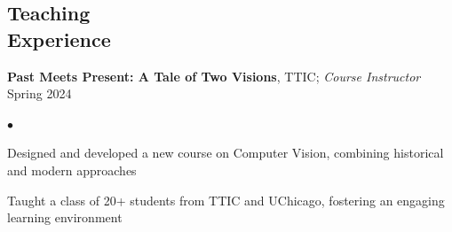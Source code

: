 \documentclass[margin,line]{res}
\newenvironment{list2}{
  \begin{list}{$\bullet$}{%
      \setlength{\itemsep}{0in}
      \setlength{\parsep}{0in} \setlength{\parskip}{0in}
      \setlength{\topsep}{0in} \setlength{\partopsep}{0in} 
      \setlength{\leftmargin}{0.2in}}}{\end{list}}
\begin{document}
\begin{resume}
\section{\sc \large Teaching \\ Experience}
\textbf{Past Meets Present: A Tale of Two Visions}, TTIC; \textit{Course Instructor} \hfill {\hfill Spring 2024}
\begin{list2}
\item Designed and developed a new course on Computer Vision, combining historical and modern approaches
\item Taught a class of 20+ students from TTIC and UChicago, fostering an engaging learning environment
\end{list2}


\end{resume}
\end{document}
